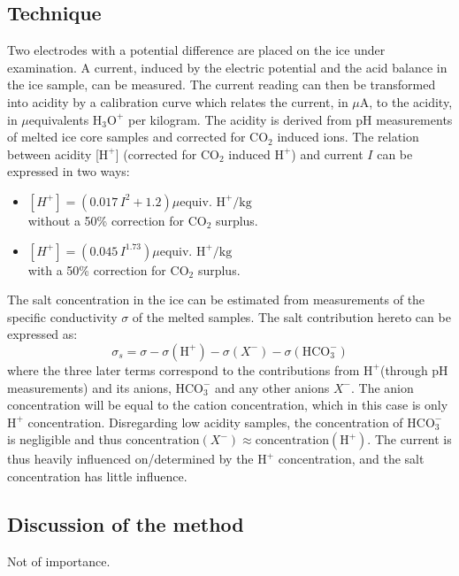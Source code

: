 \documentclass[11pt]{article}
\begin{document}
\subsection{Technique}
Two electrodes with a potential difference are placed on the ice under examination. A current, induced by the electric potential and the acid balance in the ice sample, can be measured. The current reading can then be transformed into acidity by a calibration curve which relates the current, in $\mu$A, to the acidity, in $\mu$equivalents $\text{H}_3\text{O}^+$ per kilogram. The acidity is derived from pH measurements of melted ice core samples and corrected for $\text{CO}_2$ induced ions. 
The relation between acidity [$\text{H}^+$] (corrected for $\text{CO}_2$ induced $\text{H}^+$) and current $I$ can be expressed in two ways:
\begin{itemize}
	\item $[H^+] = (0.017\, I^2 + 1.2) \mu \text{equiv. H}^+ /\text{kg}$\\
	without a 50\% correction for $\text{CO}_2$ surplus.
	\item $[H^+] = (0.045\, I^{1.73}) \mu \text{equiv. H}^+ /\text{kg}$\\
	with a 50\% correction for $\text{CO}_2$ surplus.
\end{itemize}
The salt concentration in the ice can be estimated from measurements of the specific conductivity $\sigma$ of the melted samples. The salt contribution hereto can be expressed as:
\begin{equation}
	\sigma_s = \sigma - \sigma(\text{H}^+) - \sigma(X^-) - \sigma(\text{HCO}_3^-)
\end{equation}
where the three later terms correspond to the contributions from $\text{H}^+$(through pH measurements) and its anions\footnotemark, $\text{HCO}_3^-$ and any other anions $X^-$. The anion concentration will be equal to the cation concentration, which in this case is only $\text{H}^+$ concentration. Disregarding low acidity samples, the concentration of $\text{HCO}_3^-$ is negligible and thus  $\text{concentration}(X^-) \approx \text{concentration}(\text{H}^+)$. 
The current is thus heavily influenced on/determined by the $\text{H}^+$ concentration, and the salt concentration has little influence.

\subsection{Discussion of the method}
Not of importance.
\end{document}
